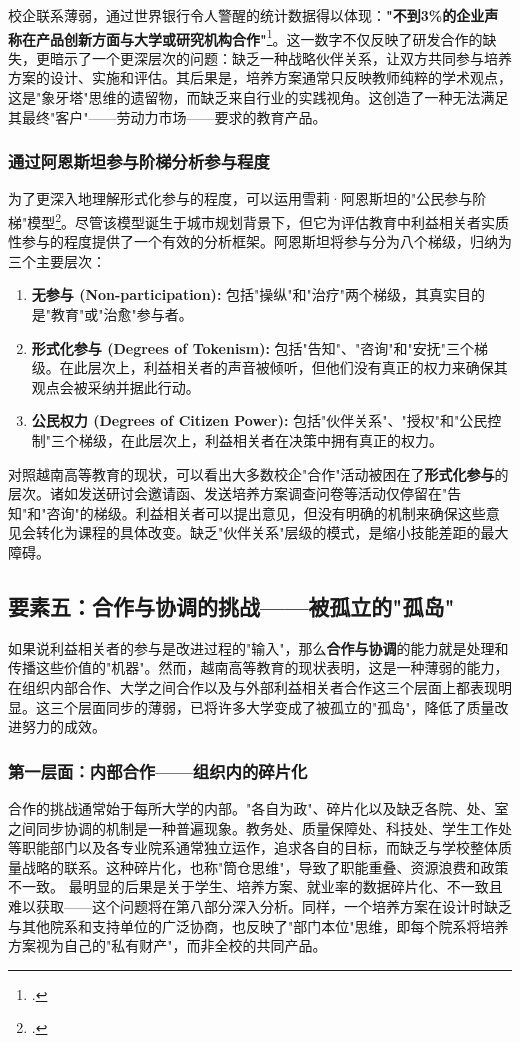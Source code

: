 校企联系薄弱，通过世界银行令人警醒的统计数据得以体现：\textbf{"不到3\%的企业声称在产品创新方面与大学或研究机构合作"}\footcite{worldbank_improvingperformance_2020}。这一数字不仅反映了研发合作的缺失，更暗示了一个更深层次的问题：缺乏一种战略伙伴关系，让双方共同参与培养方案的设计、实施和评估。其后果是，培养方案通常只反映教师纯粹的学术观点，这是"象牙塔"思维的遗留物，而缺乏来自行业的实践视角。这创造了一种无法满足其最终"客户"——劳动力市场——要求的教育产品。

\subsubsection{通过阿恩斯坦参与阶梯分析参与程度}
为了更深入地理解形式化参与的程度，可以运用雪莉·阿恩斯坦的"公民参与阶梯"模型\footcite{Arnstein1969}。尽管该模型诞生于城市规划背景下，但它为评估教育中利益相关者实质性参与的程度提供了一个有效的分析框架。阿恩斯坦将参与分为八个梯级，归纳为三个主要层次：
\begin{enumerate}
    \item \textbf{无参与 (Non-participation):} 包括"操纵"和"治疗"两个梯级，其真实目的是"教育"或"治愈"参与者。
    \item \textbf{形式化参与 (Degrees of Tokenism):} 包括"告知"、"咨询"和"安抚"三个梯级。在此层次上，利益相关者的声音被倾听，但他们没有真正的权力来确保其观点会被采纳并据此行动。
    \item \textbf{公民权力 (Degrees of Citizen Power):} 包括"伙伴关系"、"授权"和"公民控制"三个梯级，在此层次上，利益相关者在决策中拥有真正的权力。
\end{enumerate}
对照越南高等教育的现状，可以看出大多数校企"合作"活动被困在了\textbf{形式化参与}的层次。诸如发送研讨会邀请函、发送培养方案调查问卷等活动仅停留在"告知"和"咨询"的梯级。利益相关者可以提出意见，但没有明确的机制来确保这些意见会转化为课程的具体改变。缺乏"伙伴关系"层级的模式，是缩小技能差距的最大障碍。

\subsection{要素五：合作与协调的挑战——被孤立的"孤岛"}
\label{subsec:thach_thuc_hoptac}

如果说利益相关者的参与是改进过程的"输入"，那么\textbf{合作与协调}的能力就是处理和传播这些价值的"机器"。然而，越南高等教育的现状表明，这是一种薄弱的能力，在组织内部合作、大学之间合作以及与外部利益相关者合作这三个层面上都表现明显。这三个层面同步的薄弱，已将许多大学变成了被孤立的"孤岛"，降低了质量改进努力的成效。

\subsubsection{第一层面：内部合作——组织内的碎片化}
合作的挑战通常始于每所大学的内部。"各自为政"、碎片化以及缺乏各院、处、室之间同步协调的机制是一种普遍现象。教务处、质量保障处、科技处、学生工作处等职能部门以及各专业院系通常独立运作，追求各自的目标，而缺乏与学校整体质量战略的联系。这种碎片化，也称"筒仓思维"，导致了职能重叠、资源浪费和政策不一致。
最明显的后果是关于学生、培养方案、就业率的数据碎片化、不一致且难以获取——这个问题将在第八部分深入分析。同样，一个培养方案在设计时缺乏与其他院系和支持单位的广泛协商，也反映了"部门本位"思维，即每个院系将培养方案视为自己的"私有财产"，而非全校的共同产品。

